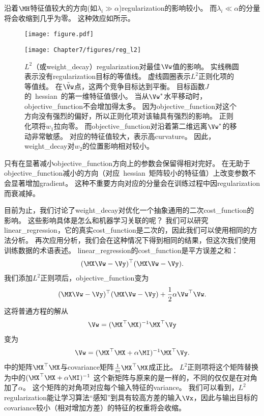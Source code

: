 沿着$\MH$特征值较大的方向(如$\lambda_i \gg \alpha$)\gls{regularization}的影响较小。
而$\lambda_i \ll \alpha$的分量将会收缩到几乎为零。
这种效应如所示。
\begin{figure}[!htb]
\ifOpenSource
\centerline{\texttt{[image: figure.pdf]}}
\else
\centerline{\texttt{[image: Chapter7/figures/reg\_l2]}}
\fi
\caption{$L^2$（或\gls{weight_decay}）\gls{regularization}对最佳$\Vw$值的影响。
实线椭圆表示没有\gls{regularization}目标的等值线。
虚线圆圈表示$L^2$正则化项的等值线。
在$\tilde{\Vw}$点，这两个竞争目标达到平衡。
目标函数$J$的~\gls{hessian}~的第一维特征值很小。
当从$\Vw^*$水平移动时，\gls{objective_function}不会增加得太多。
因为\gls{objective_function}对这个方向没有强烈的偏好，所以正则化项对该轴具有强烈的影响。
正则化项将$w_1$拉向零。
而\gls{objective_function}对沿着第二维远离$\Vw^*$的移动非常敏感。
对应的特征值较大，表示高\gls{curvature}。
因此，\gls{weight_decay}对$w_2$的位置影响相对较小。
}
\label{fig:chap7_reg_l2}
\end{figure}


只有在显著减小\gls{objective_function}方向上的参数会保留得相对完好。
在无助于\gls{objective_function}减小的方向（对应~\gls{hessian}~矩阵较小的特征值）上改变参数不会显著增加\gls{gradient}。
这种不重要方向对应的分量会在训练过程中因\gls{regularization}而衰减掉。


目前为止，我们讨论了\gls{weight_decay}对优化一个抽象通用的二次\gls{cost_function}的影响。
这些影响具体是怎么和机器学习关联的呢？
我们可以研究\gls{linear_regression}，它的真实\gls{cost_function}是二次的，因此我们可以使用相同的方法分析。
再次应用分析，我们会在这种情况下得到相同的结果，但这次我们使用训练数据的术语表述。
\gls{linear_regression}的\gls{cost_function}是平方误差之和：
\begin{align}
 (\MX \Vw - \Vy)^\top (\MX \Vw - \Vy).
\end{align}
我们添加$L^2$正则项后，\gls{objective_function}变为
\begin{align}
  (\MX \Vw - \Vy)^\top (\MX \Vw - \Vy) + \frac{1}{2}\alpha \Vw^\top \Vw.
\end{align}
这将普通方程的解从
\begin{align}
\label{eq:716w}
  \Vw = (\MX^\top \MX)^{-1} \MX^\top \Vy
\end{align}
变为
\begin{align}
\label{eq:717mw}
   \Vw = (\MX^\top \MX + \alpha \MI)^{-1} \MX^\top \Vy .
\end{align}
中的矩阵$\MX^\top\MX$与\gls{covariance}矩阵$\frac{1}{m}\MX^\top\MX$成正比。
$L^2$正则项将这个矩阵替换为中的$ (\MX^\top \MX + \alpha \MI)^{-1}$
这个新矩阵与原来的是一样的，不同的仅仅是在对角加了$\alpha$。
这个矩阵的对角项对应每个输入特征的\gls{variance}。
我们可以看到，$L^2$\gls{regularization}能让学习算法``感知''到具有较高方差的输入$\Vx$，因此与输出目标的\gls{covariance}较小（相对增加方差）的特征的权重将会收缩。

